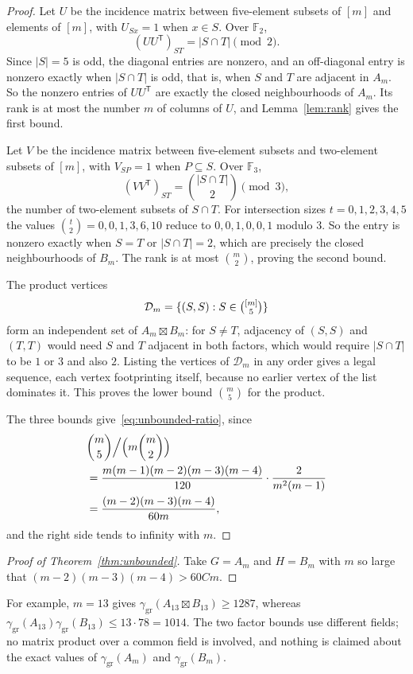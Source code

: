 \documentclass[11pt,a4paper,reqno]{amsart}
\theoremstyle{definition}
\theoremstyle{remark}
\numberwithin{equation}{section}
\newcommand{\ggr}{\gamma_{\mathrm{gr}}}
\newcommand{\sprod}{\boxtimes}
\newcommand{\F}{\mathbb{F}}
\begin{document}
\begin{proof}
Let $U$ be the incidence matrix between five-element subsets of $[m]$ and elements of $[m]$, with $U_{Sx}=1$ when $x\in S$. Over $\F_2$,
\[
 (UU^{\mathsf T})_{ST}=|S\cap T|\pmod2.
\]
Since $|S|=5$ is odd, the diagonal entries are nonzero, and an off-diagonal entry is nonzero exactly when $|S\cap T|$ is odd, that is, when $S$ and $T$ are adjacent in $A_m$. So the nonzero entries of $UU^{\mathsf T}$ are exactly the closed neighbourhoods of $A_m$. Its rank is at most the number $m$ of columns of $U$, and Lemma~\ref{lem:rank} gives the first bound.

Let $V$ be the incidence matrix between five-element subsets and two-element subsets of $[m]$, with $V_{SP}=1$ when $P\subseteq S$. Over $\F_3$,
\[
 (VV^{\mathsf T})_{ST}=\binom{|S\cap T|}{2}\pmod3,
\]
the number of two-element subsets of $S\cap T$. For intersection sizes $t=0,1,2,3,4,5$ the values $\binom t2=0,0,1,3,6,10$ reduce to $0,0,1,0,0,1$ modulo $3$. So the entry is nonzero exactly when $S=T$ or $|S\cap T|=2$, which are precisely the closed neighbourhoods of $B_m$. The rank is at most $\binom m2$, proving the second bound.

The product vertices
\[
 \mathcal D_m=\{(S,S):S\in\tbinom{[m]}5\}
\]
form an independent set of $A_m\sprod B_m$: for $S\ne T$, adjacency of $(S,S)$ and $(T,T)$ would need $S$ and $T$ adjacent in both factors, which would require $|S\cap T|$ to be $1$ or $3$ and also $2$. Listing the vertices of $\mathcal D_m$ in any order gives a legal sequence, each vertex footprinting itself, because no earlier vertex of the list dominates it. This proves the lower bound $\binom m5$ for the product.

The three bounds give~\eqref{eq:unbounded-ratio}, since
\begin{align*}
&\binom m5\Big/\Bigl(m\binom m2\Bigr)\\
 &=\frac{m(m-1)(m-2)(m-3)(m-4)}{120}\cdot\frac{2}{m^2(m-1)}\\
 &=\frac{(m-2)(m-3)(m-4)}{60m},
\end{align*}
and the right side tends to infinity with $m$.
\end{proof}

\begin{proof}[Proof of Theorem~\ref{thm:unbounded}]
Take $G=A_m$ and $H=B_m$ with $m$ so large that $(m-2)(m-3)(m-4)>60Cm$.
\end{proof}

For example, $m=13$ gives $\ggr(A_{13}\sprod B_{13})\ge1287$, whereas $\ggr(A_{13})\ggr(B_{13})\le13\cdot78=1014$. The two factor bounds use different fields; no matrix product over a common field is involved, and nothing is claimed about the exact values of $\ggr(A_m)$ and $\ggr(B_m)$.
\end{document}
